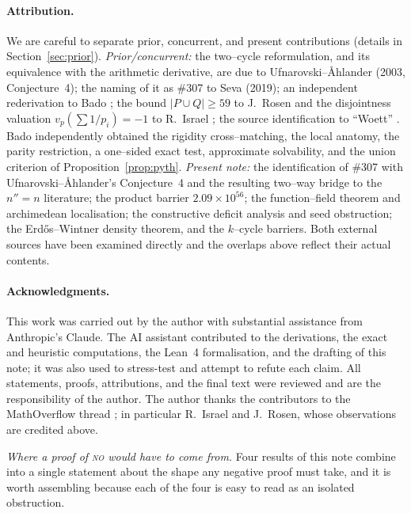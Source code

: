 \documentclass[11pt]{article}
\theoremstyle{definition}
\begin{document}
\paragraph{Attribution.}
We are careful to separate prior, concurrent, and present contributions (details in
Section~\ref{sec:prior}). \emph{Prior/concurrent:} the two--cycle reformulation, and its
equivalence with the arithmetic derivative, are due to Ufnarovski--\AA hlander
\cite{UfnarovskiAhlander2003} (2003, Conjecture~4); the naming of it as \#307 to Seva
\cite{Seva323194} (2019); an independent rederivation to Bado \cite{Bado2026}; the bound $|P\cup Q|\ge59$ to
J.~Rosen and the disjointness valuation $v_p(\sum1/p_i)=-1$ to R.~Israel \cite{MO320838}; the source
identification to ``Woett'' \cite{MO320838}. Bado \cite{Bado2026} independently obtained the rigidity
cross--matching, the local anatomy, the parity restriction, a one--sided exact test, approximate
solvability, and the union criterion of Proposition~\ref{prop:pyth}. \emph{Present note:} the identification of \#307 with
Ufnarovski--\AA hlander's Conjecture~4 and the resulting two--way bridge to the $n''=n$ literature; the product barrier $2.09\times10^{56}$; the
function--field theorem and archimedean localisation; the constructive deficit analysis and seed
obstruction; the Erd\H{o}s--Wintner density theorem, and the $k$--cycle barriers. Both external
sources \cite{Seva323194,Bado2026} have been examined directly and the overlaps above reflect their
actual contents.

\paragraph{Acknowledgments.}
This work was carried out by the author with substantial assistance from Anthropic's Claude. The
AI assistant contributed to the derivations, the exact and heuristic computations, the Lean~4
formalisation, and the drafting of this note; it was also used to stress-test and attempt to
refute each claim. All statements, proofs, attributions, and the final text were reviewed and are
the responsibility of the author. The author thanks the contributors to the MathOverflow thread
\cite{MO320838}; in particular R.~Israel and J.~Rosen, whose observations are credited above.

\emph{Where a proof of \textsc{no} would have to come from.} Four results of this note combine into a single statement about the shape any negative proof must
take, and it is worth assembling because each of the four is easy to read as an isolated obstruction.
\end{document}
